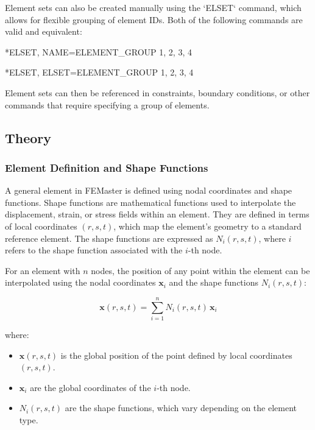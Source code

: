 Element sets can also be created manually using the `ELSET` command, which allows for flexible grouping of element IDs.
Both of the following commands are valid and equivalent:

\begin{codeBlock}
*ELSET, NAME=ELEMENT_GROUP
1, 2, 3, 4
\end{codeBlock}

\begin{codeBlock}
*ELSET, ELSET=ELEMENT_GROUP
1, 2, 3, 4
\end{codeBlock}

Element sets can then be referenced in constraints, boundary conditions, or other commands that require specifying a group of elements.

\subsection{Theory}

\subsubsection{Element Definition and Shape Functions}

A general element in FEMaster is defined using nodal coordinates and shape functions. Shape functions are mathematical functions used to interpolate the displacement, strain, or stress fields within an element. They are defined in terms of local coordinates \((r, s, t)\), which map the element's geometry to a standard reference element. The shape functions are expressed as \( N_i(r, s, t) \), where \( i \) refers to the shape function associated with the \(i\)-th node.

For an element with \( n \) nodes, the position of any point within the element can be interpolated using the nodal coordinates \( \mathbf{x}_i \) and the shape functions \( N_i(r, s, t) \):

\[
\mathbf{x}(r, s, t) = \sum_{i=1}^{n} N_i(r, s, t) \, \mathbf{x}_i
\]

where:
\begin{itemize}
    \item \( \mathbf{x}(r, s, t) \) is the global position of the point defined by local coordinates \( (r, s, t) \).
    \item \( \mathbf{x}_i \) are the global coordinates of the \(i\)-th node.
    \item \( N_i(r, s, t) \) are the shape functions, which vary depending on the element type.
\end{itemize}

